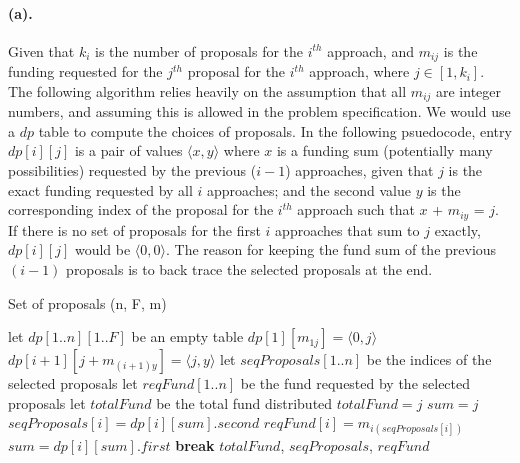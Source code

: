 \documentclass[12pt]{article}
\begin{document}
\paragraph{(a).} Given that \(k_i\) is the number of proposals for the \(i^{th}\) approach, and \(m_{ij}\) is the funding requested for the \(j^{th}\) proposal for the \(i^{th}\) approach, where \(j \in [1, k_i]\). The following algorithm relies heavily on the assumption that all \(m_{ij}\) are integer numbers, and assuming this is allowed in the problem specification. We would use a \(dp\) table to compute the choices of proposals. In the following psuedocode, entry \(dp[i][j]\) is a pair of values \(\langle x,y\rangle\) where \(x\) is a funding sum (potentially many possibilities) requested by the previous (\(i-1\)) approaches, given that \(j\) is the exact funding requested by all \(i\) approaches; and the second value \(y\) is the corresponding index of the proposal for the \(i^{th}\) approach such that \(x\) + \(m_{iy}\) = \(j\). If there is no set of proposals for the first \(i\) approaches that sum to \(j\) exactly, \(dp[i][j]\) would be \(\langle 0,0\rangle\). The reason for keeping the fund sum of the previous \((i-1)\) proposals is to back trace the selected proposals at the end.
\begin{algorithm}[H]
     \caption{Set of proposals (n, F, m)}
     \begin{algorithmic}[1]
          \State let \(dp[1..n][1..F]\) be an empty table 
               \State \(dp[1][m_{1j}] = \langle 0,j \rangle\) 
          \EndFor
                                   \State \(dp[i+1][j+m_{(i+1)y}] = \langle j,y \rangle\)
                              \EndIf
                         \EndFor
                    \EndIf
               \EndFor
          \EndFor
          \State let \(seqProposals[1..n]\) be the indices of the selected proposals
          \State let \(reqFund[1..n]\) be the fund requested by the selected proposals
          \State let \(totalFund\) be the total fund distributed
                
                    \State \(totalFund = j\)
                    \State \(sum = j\)
                     
                         \State \(seqProposals[i] = dp[i][sum].second\)
                         \State \(reqFund[i] = m_{i(seqProposals[i])}\)
                         \State \(sum = dp[i][sum].first\)
                    \EndFor
                    \State \textbf{break}
               \EndIf
          \EndFor
          \State \Return \(totalFund\), \(seqProposals\), \(reqFund\)
     \end{algorithmic}
\end{algorithm}
\end{document}
